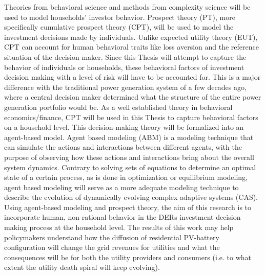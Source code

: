 Theories from behavioral science and methods from complexity science will be used to model households' investor behavior. Prospect theory (PT), more specifically cumulative prospect theory (CPT), will be used to model the investment decisions made by individuals. Unlike expected utility theory (EUT), CPT can account for human behavioral traits like loss aversion and the reference situation of the decision maker. Since this Thesis will attempt to capture the behavior of individuals or households, these behavioral factors of investment decision making with a level of risk will have to be accounted for. This is a major difference with the traditional power generation system of a few decades ago, where a central decision maker determined what the structure of the entire power generation portfolio would be. As a well established theory in behavioral economics/finance, CPT will be used in this Thesis to capture behavioral factors on a household level. This decision-making theory will be formalized into an agent-based model. Agent based modeling (ABM) is a modeling technique that can simulate the actions and interactions between different agents, with the purpose of observing how these actions and interactions bring about the overall system dynamics. Contrary to solving sets of equations to determine an optimal state of a certain process, as is done in optimization or equilibrium modeling, agent based modeling will serve as a more adequate modeling technique to describe the evolution of dynamically evolving complex adaptive systems (CAS). Using agent-based modeling and prospect theory, the aim of this research is to incorporate human, non-rational behavior in the DERs investment decision making process at the household level. The results of this work may help policymakers understand how the diffusion of residential PV-battery configuration will change the grid revenues for utilities and what the consequences will be for both the utility providers and consumers (i.e. to what extent the utility death spiral will keep evolving).
\newline \newline \noindent
